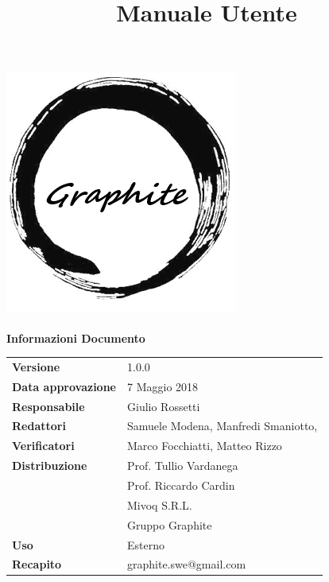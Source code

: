 \documentclass[openany,12pt,a4paper]{report}
\title{Manuale Utente}
\author{}
\newcommand{\versione}{1.0.0}
\begin{document}
	\makeatletter
	\begin{titlepage}
		\setlength{\headsep}{0pt}  
		\begin{center}
			\includegraphics[width=0.5\linewidth]{img/logo.png}\\[1em]
			{\huge \bfseries  \@title }\\[10ex]
			\textbf{\Large Informazioni Documento} \\[2em]
			\bgroup
			\def\arraystretch{1.5}
			\begin{tabular}{l|l}
				\textbf{Versione} & \versione{} \\
				\textbf{Data approvazione} & 7 Maggio 2018 \\
				\textbf{Responsabile} & Giulio Rossetti \\
				\textbf{Redattori} & Samuele Modena, Manfredi Smaniotto, \\
				\textbf{Verificatori} & Marco Focchiatti, Matteo Rizzo \\
				\textbf{Distribuzione} & Prof. Tullio Vardanega \\
				& Prof. Riccardo Cardin \\
				& Mivoq S.R.L. \\
				& Gruppo Graphite \\
				\textbf{Uso} & Esterno \\
				\textbf{Recapito} & graphite.swe@gmail.com \\
			\end{tabular}
			\egroup
		\end{center}
	\end{titlepage}
	\makeatother
	
	\thispagestyle{empty}
	\newpage
	
	
\end{document}
